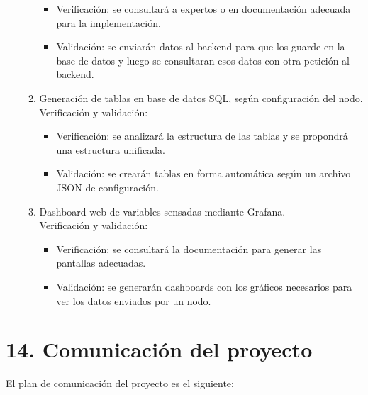 \documentclass[11pt]{charter}
\begin{document}
\begin{enumerate}
\begin{enumerate}
		\begin{itemize}
		\item Verificación: se consultará a expertos o en documentación adecuada para la implementación.
		\item Validación: se enviarán datos al backend para que los guarde en la base de datos y luego se consultaran esos datos con otra petición al backend.
		\end{itemize}
	\item Generación de tablas en base de datos SQL, según configuración del nodo.
		\\Verificación y validación:
		\begin{itemize}
		\item Verificación: se analizará la estructura de las tablas y se propondrá una estructura unificada.
		\item Validación: se crearán tablas en forma automática según un archivo JSON de configuración.
		\end{itemize}
	\item Dashboard web de variables sensadas mediante Grafana.
		\\Verificación y validación:
		\begin{itemize}
		\item Verificación: se consultará la documentación para generar las pantallas adecuadas.
		\item Validación: se generarán dashboards con los gráficos necesarios para ver los datos enviados por un nodo.
		\end{itemize}
	\end{enumerate}
\end{enumerate}

\section{14. Comunicación del proyecto}
\label{sec:comunicaciones}

El plan de comunicación del proyecto es el siguiente:
\end{document}
